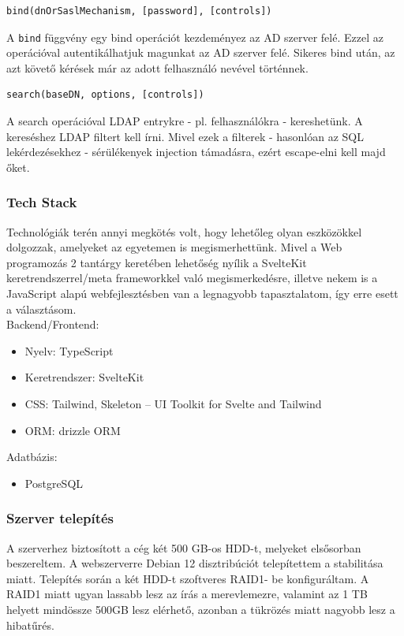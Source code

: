 \documentclass[a4paper]{article}
\newcommand{\inlts}[1]{\texttt{#1}}
\begin{document}
\FloatBarrier
\begin{verbatim}
bind(dnOrSaslMechanism, [password], [controls])
\end{verbatim}

A \inlts{bind} függvény egy bind operációt kezdeményez az AD szerver felé. Ezzel az operációval
autentikálhatjuk magunkat az AD szerver felé. Sikeres bind után, az azt követő kérések már az adott
felhasználó nevével történnek.

\FloatBarrier
\begin{verbatim}
search(baseDN, options, [controls])
\end{verbatim}

A search operációval LDAP entrykre - pl. felhasználókra - kereshetünk. A kereséshez LDAP filtert kell
írni. Mivel ezek a filterek - hasonlóan az SQL lekérdezésekhez - sérülékenyek injection támadásra, ezért
escape-elni kell majd őket.

\subsubsection*{Tech Stack}
Technológiák terén annyi megkötés volt, hogy lehetőleg olyan eszközökkel dolgozzak, amelyeket az
egyetemen is megismerhettünk. Mivel a Web programozás 2 tantárgy keretében lehetőség nyílik a
SvelteKit keretrendszerrel/meta frameworkkel való megismerkedésre, illetve nekem is a JavaScript
alapú webfejlesztésben van a legnagyobb tapasztalatom, így erre esett a választásom.\\

Backend/Frontend:
\begin{itemize}
  \item Nyelv: TypeScript
  \item Keretrendszer: SvelteKit
  \item CSS: Tailwind, Skeleton – UI Toolkit for Svelte and Tailwind
  \item ORM: drizzle ORM
\end{itemize}

Adatbázis:
\begin{itemize}
  \item PostgreSQL
\end{itemize}

\subsubsection*{Szerver telepítés}
A szerverhez biztosított a cég két 500 GB-os HDD-t, melyeket elsősorban beszereltem. A webszerverre
Debian 12 disztribúciót telepítettem a stabilitása miatt. Telepítés során a két HDD-t szoftveres RAID1-
be konfiguráltam. A RAID1 miatt ugyan lassabb lesz az írás a merevlemezre, valamint az 1 TB helyett
mindössze 500GB lesz elérhető, azonban a tükrözés miatt nagyobb lesz a hibatűrés.
\end{document}
